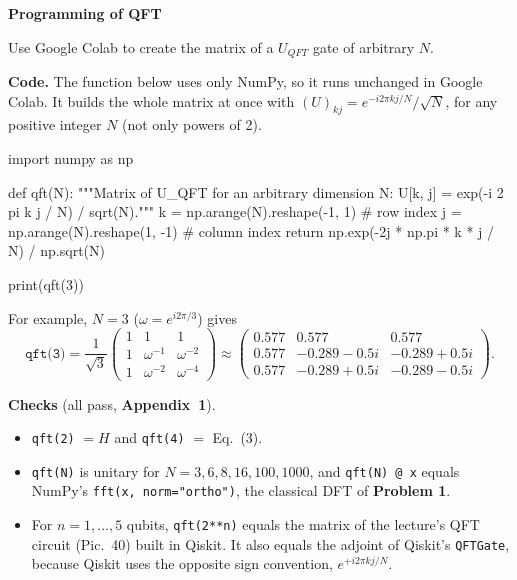 \documentclass[a4paper, 10pt]{article}
\begin{document}
\begin{problem}
\textbf{Programming of QFT}
\par Use Google Colab to create the matrix of a \( U_{QFT} \) gate of arbitrary \( N \).
\end{problem}

\begin{solution}
	\noindent \textbf{Code.} The function below uses only NumPy, so it runs unchanged in Google Colab. It builds the whole matrix at once with \( (U)_{kj} = e^{-i2\pi kj/N}/\sqrt{N} \), for any positive integer \( N \) (not only powers of 2).

	\myspace

	\begin{codingbox*}
import numpy as np

def qft(N):
    """Matrix of U_QFT for an arbitrary dimension N:  U[k, j] = exp(-i 2 pi k j / N) / sqrt(N)."""
    k = np.arange(N).reshape(-1, 1)        # row index
    j = np.arange(N).reshape(1, -1)        # column index
    return np.exp(-2j * np.pi * k * j / N) / np.sqrt(N)

print(qft(3))
\end{codingbox*}
	For example, \( N = 3 \) (\( \omega = e^{i2\pi/3} \)) gives
	\[
		\texttt{qft(3)} = \frac{1}{\sqrt{3}}\begin{pmatrix}
			1 & 1             & 1             \\
			1 & \omega^{-1} & \omega^{-2} \\
			1 & \omega^{-2} & \omega^{-4}
		\end{pmatrix} \approx \begin{pmatrix}
			0.577 & 0.577            & 0.577            \\
			0.577 & -0.289 - 0.5i & -0.289 + 0.5i \\
			0.577 & -0.289 + 0.5i & -0.289 - 0.5i
		\end{pmatrix}.
	\]

	\myspace

	\noindent \textbf{Checks} (all pass, \textbf{Appendix~1}).
	\begin{itemize}
		\item \texttt{qft(2)} \( = H \) and \texttt{qft(4)} \( = \) Eq.~(3).
		\item \texttt{qft(N)} is unitary for \( N = 3, 6, 8, 16, 100, 1000 \), and \texttt{qft(N) @ x} equals NumPy's \texttt{fft(x, norm="ortho")}, the classical DFT of \textbf{Problem 1}.
		\item For \( n = 1, \dots, 5 \) qubits, \texttt{qft(2**n)} equals the matrix of the lecture's QFT circuit (Pic.~40) built in Qiskit. It also equals the adjoint of Qiskit's \texttt{QFTGate}, because Qiskit uses the opposite sign convention, \( e^{+i2\pi kj/N} \).
	\end{itemize}
\end{solution}
\end{document}
